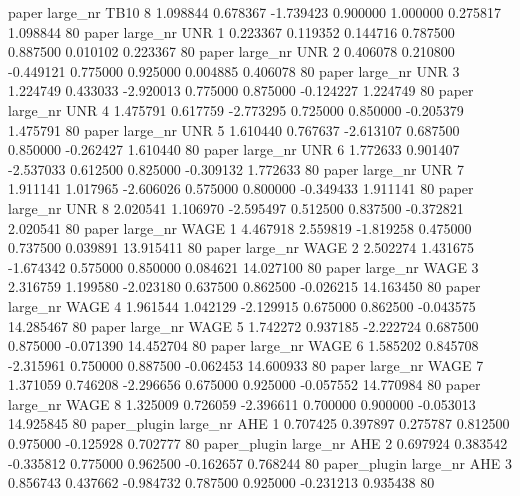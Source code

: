               paper   large_nr     TB10                 8  1.098844  0.678367  -1.739423 0.900000 1.000000  0.275817    1.098844 80
              paper   large_nr      UNR                 1  0.223367  0.119352   0.144716 0.787500 0.887500  0.010102    0.223367 80
              paper   large_nr      UNR                 2  0.406078  0.210800  -0.449121 0.775000 0.925000  0.004885    0.406078 80
              paper   large_nr      UNR                 3  1.224749  0.433033  -2.920013 0.775000 0.875000 -0.124227    1.224749 80
              paper   large_nr      UNR                 4  1.475791  0.617759  -2.773295 0.725000 0.850000 -0.205379    1.475791 80
              paper   large_nr      UNR                 5  1.610440  0.767637  -2.613107 0.687500 0.850000 -0.262427    1.610440 80
              paper   large_nr      UNR                 6  1.772633  0.901407  -2.537033 0.612500 0.825000 -0.309132    1.772633 80
              paper   large_nr      UNR                 7  1.911141  1.017965  -2.606026 0.575000 0.800000 -0.349433    1.911141 80
              paper   large_nr      UNR                 8  2.020541  1.106970  -2.595497 0.512500 0.837500 -0.372821    2.020541 80
              paper   large_nr     WAGE                 1  4.467918  2.559819  -1.819258 0.475000 0.737500  0.039891   13.915411 80
              paper   large_nr     WAGE                 2  2.502274  1.431675  -1.674342 0.575000 0.850000  0.084621   14.027100 80
              paper   large_nr     WAGE                 3  2.316759  1.199580  -2.023180 0.637500 0.862500 -0.026215   14.163450 80
              paper   large_nr     WAGE                 4  1.961544  1.042129  -2.129915 0.675000 0.862500 -0.043575   14.285467 80
              paper   large_nr     WAGE                 5  1.742272  0.937185  -2.222724 0.687500 0.875000 -0.071390   14.452704 80
              paper   large_nr     WAGE                 6  1.585202  0.845708  -2.315961 0.750000 0.887500 -0.062453   14.600933 80
              paper   large_nr     WAGE                 7  1.371059  0.746208  -2.296656 0.675000 0.925000 -0.057552   14.770984 80
              paper   large_nr     WAGE                 8  1.325009  0.726059  -2.396611 0.700000 0.900000 -0.053013   14.925845 80
       paper_plugin   large_nr      AHE                 1  0.707425  0.397897   0.275787 0.812500 0.975000 -0.125928    0.702777 80
       paper_plugin   large_nr      AHE                 2  0.697924  0.383542  -0.335812 0.775000 0.962500 -0.162657    0.768244 80
       paper_plugin   large_nr      AHE                 3  0.856743  0.437662  -0.984732 0.787500 0.925000 -0.231213    0.935438 80
